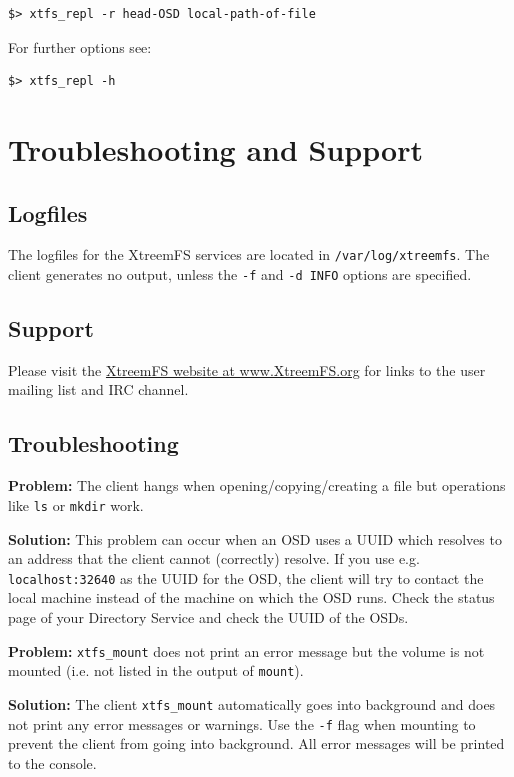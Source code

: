 \documentclass[a4paper,10pt]{book}
\begin{document}
\begin{verbatim}
$> xtfs_repl -r head-OSD local-path-of-file
\end{verbatim}

For further options see:

\begin{verbatim}
$> xtfs_repl -h
\end{verbatim}

\chapter{Troubleshooting and Support}

\section{Logfiles}

The logfiles for the XtreemFS services are located in \texttt{/var/log/xtreemfs}. The client generates no output, unless the \texttt{-f} and \texttt{-d INFO} options are specified.

\section{Support}
Please visit the \href{http://www.XtreemFS.org}{XtreemFS website at www.XtreemFS.org} for links to the user mailing list and IRC channel.

\section{Troubleshooting}

\textbf{Problem: }The client hangs when opening/copying/creating a file but operations like \texttt{ls} or \texttt{mkdir} work.

\textbf{Solution: }This problem can occur when an OSD uses a UUID which resolves to an address that the client cannot (correctly) resolve. If you use e.g. \texttt{localhost:32640} as the UUID for the OSD, the client will try to contact the local machine instead of the machine on which the OSD runs. Check the status page of your Directory Service and check the UUID of the OSDs.

\textbf{Problem: } \texttt{xtfs\_mount} does not print an error message but the volume is not mounted (i.e. not listed in the output of \texttt{mount}).

\textbf{Solution: } The client \texttt{xtfs\_mount} automatically goes into background and does not print any error messages or warnings. Use the \texttt{-f} flag when mounting to prevent the client from going into background. All error messages will be printed to the console.
\end{document}
